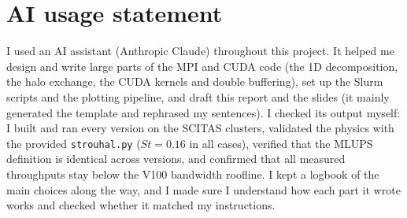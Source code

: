 \documentclass[10pt,twocolumn,a4paper]{article}
\begin{document}
\section*{AI usage statement}
\small
I used an AI assistant (Anthropic Claude) throughout this project. It
helped me design and write large parts of the MPI and CUDA code (the
1D decomposition, the halo exchange, the CUDA kernels and double
buffering), set up the Slurm scripts and the plotting pipeline, and draft
this report and the slides (it mainly generated the template and
rephrased my sentences). I checked its output myself: I built and ran
every version on the SCITAS clusters, validated the physics with the
provided \texttt{strouhal.py} ($St=0.16$ in all cases), verified that the
MLUPS definition is identical across versions, and confirmed that all
measured throughputs stay below the V100 bandwidth roofline. I kept a
logbook of the main choices along the way, and I made sure I understand
how each part it wrote works and checked whether it matched my
instructions.
\end{document}
